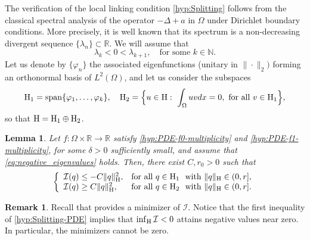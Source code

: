 \documentclass{article}
\newcommand{\boI}{\mathcal{I}}
\newcommand{\R}{\mathbb{R}}
\newcommand{\Hilb}{{\textnormal H}}
\newtheorem{lemma}{Lemma}[section]
\theoremstyle{definition}
\newtheorem{remark}{Remark}[section]
\begin{document}
The verification of the local linking condition \eqref{hyp:Splitting} follows from the classical spectral analysis of the operator $-\Delta+a$ in $\Omega$ under Dirichlet boundary conditions. More precisely, it is well known that its spectrum is a non-decreasing divergent sequence $\{\lambda_n\}\subset\R$. We will assume that
\begin{equation}\label{eq:negative_eigenvalues}
    \lambda_k< 0<\lambda_{k+1},\quad\text{for some }k\in\mathbb{N}.
\end{equation}
Let us denote by $\{\varphi_n\}$ the associated eigenfunctions (unitary in $\|\cdot\|_2)$ forming an orthonormal basis of $L^2(\Omega)$, and let us consider the subspaces
\begin{equation*}    \Hilb_1=\operatorname{span}\{\varphi_1,\dots,\varphi_k\},\quad \Hilb_2=\Big\{u\in \Hilb:\ \int_\Omega uv dx=0,\ \text{for all }v\in\Hilb_1\Big\},
\end{equation*}
so that $\Hilb=\Hilb_1\oplus\Hilb_2$.


\begin{lemma}\label{lemma:splitting-PDE}
    Let $f:\Omega\times\R\to\R$ satisfy \eqref{hyp:PDE-f0-multiplicity} and \eqref{hyp:PDE-f1-multiplicity}, for some $\delta>0$ sufficiently small, and assume that \eqref{eq:negative_eigenvalues} holds. Then, there exist $C,r_0>0$ such that
\begin{equation}\label{hyp:Splitting-PDE}
\left\{\begin{array}{ll}
\boI(q)\leq -C\|q\|_{\Hilb}^2,&\hbox{for all }q\in\Hilb_1\ \hbox{ with }\|q\|_\Hilb\in(0,r],\\
\boI(q)\geq C\|q\|_\Hilb^2,&\hbox{for all }q\in\Hilb_2\ \hbox{ with }\|q\|_\Hilb\in(0,r].
\end{array}\right.
\end{equation}
\end{lemma}

\begin{remark}\label{remark:negative-minimum-PDE}
    Recall that \cite[Theorem~2.1]{BerJebMaw} provides a minimizer of $\boI$. Notice that the first inequality of \eqref{hyp:Splitting-PDE} implies that $\inf_\Hilb\boI<0$ attains negative values near zero. In particular, the minimizers cannot be zero.
\end{remark}
\end{document}
